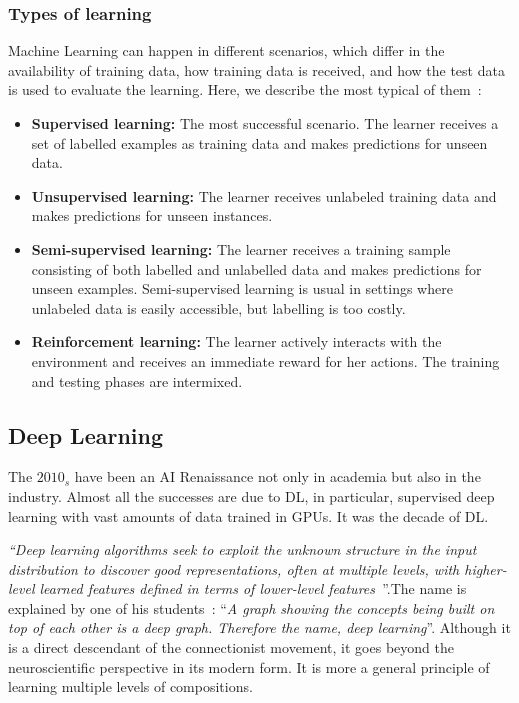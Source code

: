 \subsubsection{Types of learning} Machine Learning can happen in different scenarios, which differ in the availability of training data, how training data is received, and how the test data is used to evaluate the learning. Here, we describe the most typical of them~\cite{mohri:2012}:
\begin{itemize}
	\item \textbf{Supervised learning:} The most successful scenario. The learner receives a set of labelled examples as training data and makes predictions for unseen data.
	\item \textbf{Unsupervised learning:} The learner receives unlabeled training data and makes predictions for unseen instances.
	\item \textbf{Semi-supervised learning:} The learner receives a training sample consisting of both labelled and unlabelled data and makes predictions for unseen examples. Semi-supervised learning is usual in settings where unlabeled data is easily accessible, but labelling is too costly.
	\item \textbf{Reinforcement learning:} The learner actively interacts with the environment and receives an immediate reward for her actions. The training and testing phases are intermixed.
\end{itemize}

\subsection{Deep Learning} The \(2010_s\) have been an AI Renaissance not only in academia but also in the industry. Almost all the successes are due to \acf{DL}, in particular, supervised deep learning with vast amounts of data trained in \acfp{GPU}. It was the decade of \ac{DL}.

\emph{``Deep learning algorithms seek to exploit the unknown structure in the input distribution to discover good representations, often at multiple levels, with higher-level learned features defined in terms of lower-level features~\citeauthor{bengio:2012}}''.The name is explained by one of his students~\cite{goodfellow:2016}: ``\emph{A graph showing the concepts being built on top of each other is a deep graph. Therefore the name, deep learning}''. Although it is a direct descendant of the connectionist movement, it goes beyond the neuroscientific perspective in its modern form. It is more a general principle of learning multiple levels of compositions.

